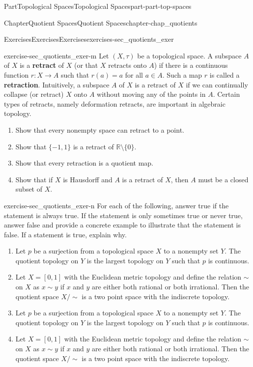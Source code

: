 \documentclass[oneside,10pt,]{book}
\newcommand{\terminology}[1]{\textbf{#1}}
\numberwithin{equation}{chapter}
\newcommand{\R}{\mathbb{R}}
\newcommand{\ssim}{\sim}
\begin{document}
\begin{partptx}{Part}{Topological Spaces}{}{Topological Spaces}{}{}{part-part-top-spaces}
\begin{chapterptx}{Chapter}{Quotient Spaces}{}{Quotient Spaces}{}{}{chapter-chap_quotients}
\begin{exercises-section}{Exercises}{Exercises}{}{Exercises}{}{}{exercises-sec_quotients_exer}
\begin{divisionexercise}{12}{}{}{exercise-sec_quotients_exer-m}
%
%
Let \((X,\tau)\) be a topological space. A subspace \(A\) of \(X\) is a \terminology{retract} of \(X\) (or that \(X\) retracts onto \(A\)) if there is a continuous function \(r : X \to A\) such that \(r(a) = a\) for all \(a \in A\). Such a map \(r\) is called a \terminology{retraction}. Intuitively, a subspace \(A\) of \(X\) is a retract of \(X\) if we can continually collapse (or retract) \(X\) onto \(A\) without moving any of the points in \(A\). Certain types of retracts, namely deformation retracts, are important in algebraic topology.%
\begin{enumerate}[font=\bfseries,label=(\alph*),ref=\alph*]%
\item{}Show that every nonempty space can retract to a point.%
\item{}Show that \(\{-1,1\}\) is a retract of \(\R \setminus \{0\}\).%
\item{}Show that every retraction is a quotient map.%
\item{}Show that if \(X\) is Hausdorff and \(A\) is a retract of \(X\), then \(A\) must be a closed subset of \(X\).%
\end{enumerate}%
\end{divisionexercise}%
\begin{divisionexercise}{13}{}{}{exercise-sec_quotients_exer-n}%
For each of the following, answer true if the statement is always true. If the statement is only sometimes true or never true, answer false and provide a concrete example to illustrate that the statement is false. If a statement is true, explain why.%
\begin{enumerate}[font=\bfseries,label=(\alph*),ref=\alph*]%
\item{}Let \(p\) be a surjection from a topological space \(X\) to a nonempty set \(Y\). The quotient topology on \(Y\) is the largest topology on \(Y\) such that \(p\) is continuous.%
\item{}Let \(X = [0,1]\) with the Euclidean metric topology and define the relation \(\sim\) on \(X\) as \(x \sim y\) if \(x\) and \(y\) are either both rational or both irrational. Then the quotient space \(X/\ssim\) is a two point space with the indiscrete topology.%
\item{}Let \(p\) be a surjection from a topological space \(X\) to a nonempty set \(Y\). The quotient topology on \(Y\) is the largest topology on \(Y\) such that \(p\) is continuous.%
\item{}Let \(X = [0,1]\) with the Euclidean metric topology and define the relation \(\sim\) on \(X\) as \(x \sim y\) if \(x\) and \(y\) are either both rational or both irrational. Then the quotient space \(X/\ssim\) is a two point space with the indiscrete topology.%

\end{enumerate}
\end{divisionexercise}
\end{exercises-section}
\end{chapterptx}
\end{partptx}
\end{document}
